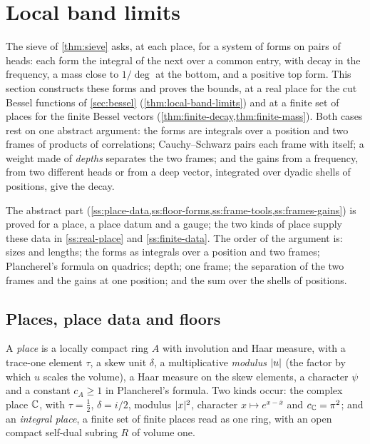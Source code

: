 \section{Local band limits}\label{sec:frames}

The sieve of \cref{thm:sieve} asks, at each place, for a system of forms on pairs of heads: each form the integral of the next over a common entry, with decay in the
frequency, a mass close to $1/\deg$ at the bottom, and a positive top form. This section constructs these forms and proves the bounds, at a real place for the cut
Bessel functions of \cref{sec:bessel} (\cref{thm:local-band-limits}) and at a finite set of places for the finite Bessel vectors (\cref{thm:finite-decay,thm:finite-mass}).
Both cases rest on one abstract argument: the forms are integrals over a position and two frames of products of correlations; Cauchy--Schwarz pairs each frame with
itself; a weight made of \emph{depths} separates the two frames; and the gains from a frequency, from two different heads or from a deep vector, integrated over dyadic
shells of positions, give the decay.

The abstract part (\cref{ss:place-data,ss:floor-forms,ss:frame-tools,ss:frames-gains}) is proved for a place, a place datum and a gauge; the two kinds of place supply these
data in \cref{ss:real-place} and \cref{ss:finite-data}. The order of the argument is: sizes and lengths; the forms as integrals over a position and two frames; Plancherel's
formula on quadrics; depth; one frame; the separation of the two frames and the gains at one position; and the sum over the shells of positions.

\subsection{Places, place data and floors}\label{ss:place-data}
A \emph{place} is a locally compact ring $A$ with involution and Haar measure, with a trace-one element $\tau$, a skew unit $\delta$, a multiplicative \emph{modulus} $\lvert u\rvert$ (the factor by which
$u$ scales the volume), a Haar measure on the skew elements, a character $\psi$ and a constant $c_A\ge1$ in Plancherel's formula. Two kinds occur: the complex place $\mathbb{C}$, with $\tau=\frac12$,
$\delta=i/2$, modulus $\lvert x\rvert^2$, character $x\mapsto e^{x-\bar x}$ and $c_{\mathbb{C}}=\pi^2$; and an \emph{integral place}, a finite set of finite places read as one ring, with an open compact self-dual subring
$R$ of volume one.

